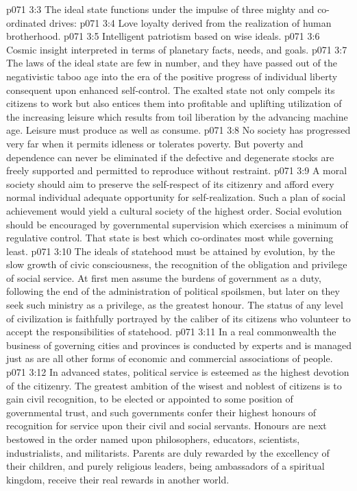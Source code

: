 \vs p071 3:3 \pc The ideal state functions under the impulse of three mighty and co\hyp{}ordinated drives:
\vs p071 3:4 \bibnobreakspace Love loyalty derived from the realization of human brotherhood.
\vs p071 3:5 \bibnobreakspace Intelligent patriotism based on wise ideals.
\vs p071 3:6 \bibnobreakspace Cosmic insight interpreted in terms of planetary facts, needs, and goals.
\vs p071 3:7 \pc The laws of the ideal state are few in number, and they have passed out of the negativistic taboo age into the era of the positive progress of individual liberty consequent upon enhanced self\hyp{}control. The exalted state not only compels its citizens to work but also entices them into profitable and uplifting utilization of the increasing leisure which results from toil liberation by the advancing machine age. Leisure must produce as well as consume.
\vs p071 3:8 No society has progressed very far when it permits idleness or tolerates poverty. But poverty and dependence can never be eliminated if the defective and degenerate stocks are freely supported and permitted to reproduce without restraint.
\vs p071 3:9 A moral society should aim to preserve the self\hyp{}respect of its citizenry and afford every normal individual adequate opportunity for self\hyp{}realization. Such a plan of social achievement would yield a cultural society of the highest order. Social evolution should be encouraged by governmental supervision which exercises a minimum of regulative control. That state is best which co\hyp{}ordinates most while governing least.
\vs p071 3:10 The ideals of statehood must be attained by evolution, by the slow growth of civic consciousness, the recognition of the obligation and privilege of social service. At first men assume the burdens of government as a duty, following the end of the administration of political spoilsmen, but later on they seek such ministry as a privilege, as the greatest honour. The status of any level of civilization is faithfully portrayed by the caliber of its citizens who volunteer to accept the responsibilities of statehood.
\vs p071 3:11 In a real commonwealth the business of governing cities and provinces is conducted by experts and is managed just as are all other forms of economic and commercial associations of people.
\vs p071 3:12 In advanced states, political service is esteemed as the highest devotion of the citizenry. The greatest ambition of the wisest and noblest of citizens is to gain civil recognition, to be elected or appointed to some position of governmental trust, and such governments confer their highest honours of recognition for service upon their civil and social servants. Honours are next bestowed in the order named upon philosophers, educators, scientists, industrialists, and militarists. Parents are duly rewarded by the excellency of their children, and purely religious leaders, being ambassadors of a spiritual kingdom, receive their real rewards in another world.
